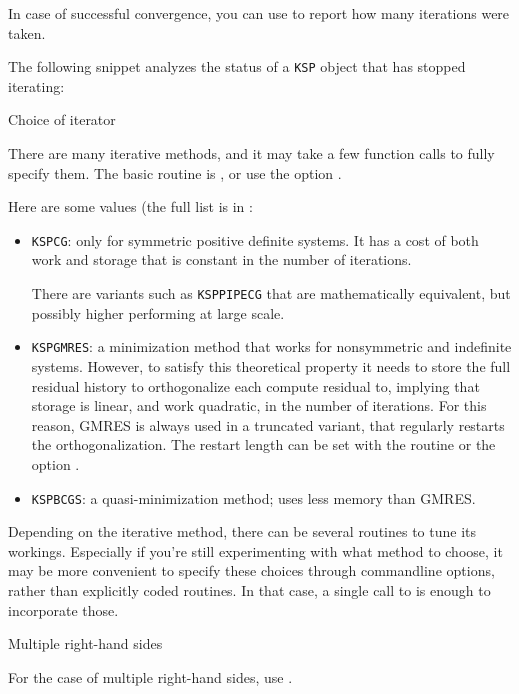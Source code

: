 In case of successful convergence, you can use 
to report how many
iterations were taken.

The following snippet analyzes the status of a \lstinline{KSP} object
that has stopped iterating:
%

 {Choice of iterator}

There are many iterative methods, and it may take a few function calls
to fully specify them. The basic routine is ,
or use the option .

Here are some values (the full list is in :
\begin{itemize}
\item \lstinline{KSPCG}: only for symmetric positive definite systems.
  It has a cost of both work and storage that is constant in the number of iterations.

  There are variants such as \lstinline{KSPPIPECG} that are mathematically equivalent,
  but possibly higher performing at large scale.
\item \lstinline{KSPGMRES}: a minimization method that works for nonsymmetric
  and indefinite systems. However, to satisfy this theoretical property
  it needs to store the full residual history to orthogonalize each
  compute residual to, implying that storage
  is linear, and work quadratic, in the number of iterations.
  For this reason, GMRES is always used in a truncated variant, that regularly restarts
  the orthogonalization. The restart length can be set with the routine
   or the option .
\item \lstinline{KSPBCGS}: a quasi-minimization method; uses less memory than GMRES.
\end{itemize}

Depending on the iterative method, there can be several routines to tune its workings.
Especially if you're still experimenting with what method to choose,
it may be more convenient to specify these choices through commandline options,
rather than explicitly coded routines. In that case, a single call to
 is enough to incorporate those.

 {Multiple right-hand sides}

For the case of multiple right-hand sides,
use .

